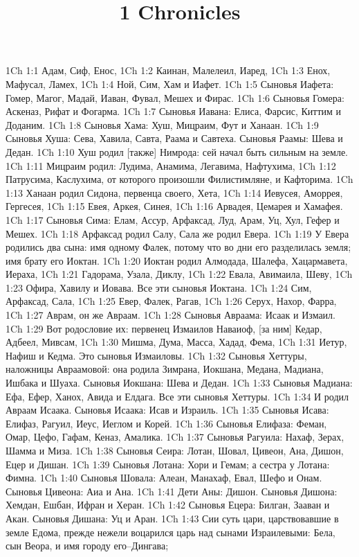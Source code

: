 

\title{1 Chronicles}

1Ch 1:1  Адам, Сиф, Енос,
1Ch 1:2  Каинан, Малелеил, Иаред,
1Ch 1:3  Енох, Мафусал, Ламех,
1Ch 1:4  Ной, Сим, Хам и Иафет.
1Ch 1:5  Сыновья Иафета: Гомер, Магог, Мадай, Иаван, Фувал, Мешех и Фирас.
1Ch 1:6  Сыновья Гомера: Аскеназ, Рифат и Фогарма.
1Ch 1:7  Сыновья Иавана: Елиса, Фарсис, Киттим и Доданим.
1Ch 1:8  Сыновья Хама: Хуш, Мицраим, Фут и Ханаан.
1Ch 1:9  Сыновья Хуша: Сева, Хавила, Савта, Раама и Савтеха. Сыновья Раамы: Шева и Дедан.
1Ch 1:10  Хуш родил [также] Нимрода: сей начал быть сильным на земле.
1Ch 1:11  Мицраим родил: Лудима, Анамима, Легавима, Нафтухима,
1Ch 1:12  Патрусима, Каслухима, от которого произошли Филистимляне, и Кафторима.
1Ch 1:13  Ханаан родил Сидона, первенца своего, Хета,
1Ch 1:14  Иевусея, Аморрея, Гергесея,
1Ch 1:15  Евея, Аркея, Синея,
1Ch 1:16  Арвадея, Цемарея и Хамафея.
1Ch 1:17  Сыновья Сима: Елам, Ассур, Арфаксад, Луд, Арам, Уц, Хул, Гефер и Мешех.
1Ch 1:18  Арфаксад родил Салу, Сала же родил Евера.
1Ch 1:19  У Евера родились два сына: имя одному Фалек, потому что во дни его разделилась земля; имя брату его Иоктан.
1Ch 1:20  Иоктан родил Алмодада, Шалефа, Хацармавета, Иераха,
1Ch 1:21  Гадорама, Узала, Диклу,
1Ch 1:22  Евала, Авимаила, Шеву,
1Ch 1:23  Офира, Хавилу и Иовава. Все эти сыновья Иоктана.
1Ch 1:24  Сим, Арфаксад, Сала,
1Ch 1:25  Евер, Фалек, Рагав,
1Ch 1:26  Серух, Нахор, Фарра,
1Ch 1:27  Аврам, он же Авраам.
1Ch 1:28  Сыновья Авраама: Исаак и Измаил.
1Ch 1:29  Вот родословие их: первенец Измаилов Наваиоф, [за ним] Кедар, Адбеел, Мивсам,
1Ch 1:30  Мишма, Дума, Масса, Хадад, Фема,
1Ch 1:31  Иетур, Нафиш и Кедма. Это сыновья Измаиловы.
1Ch 1:32  Сыновья Хеттуры, наложницы Авраамовой: она родила Зимрана, Иокшана, Медана, Мадиана, Ишбака и Шуаха. Сыновья Иокшана: Шева и Дедан.
1Ch 1:33  Сыновья Мадиана: Ефа, Ефер, Ханох, Авида и Елдага. Все эти сыновья Хеттуры.
1Ch 1:34  И родил Авраам Исаака. Сыновья Исаака: Исав и Израиль.
1Ch 1:35  Сыновья Исава: Елифаз, Рагуил, Иеус, Иеглом и Корей.
1Ch 1:36  Сыновья Елифаза: Феман, Омар, Цефо, Гафам, Кеназ, Амалика.
1Ch 1:37  Сыновья Рагуила: Нахаф, Зерах, Шамма и Миза.
1Ch 1:38  Сыновья Сеира: Лотан, Шовал, Цивеон, Ана, Дишон, Ецер и Дишан.
1Ch 1:39  Сыновья Лотана: Хори и Гемам; а сестра у Лотана: Фимна.
1Ch 1:40  Сыновья Шовала: Алеан, Манахаф, Евал, Шефо и Онам. Сыновья Цивеона: Аиа и Ана.
1Ch 1:41  Дети Аны: Дишон. Сыновья Дишона: Хемдан, Ешбан, Ифран и Херан.
1Ch 1:42  Сыновья Ецера: Билган, Зааван и Акан. Сыновья Дишана: Уц и Аран.
1Ch 1:43  Сии суть цари, царствовавшие в земле Едома, прежде нежели воцарился царь над сынами Израилевыми: Бела, сын Веора, и имя городу его--Дингава;
